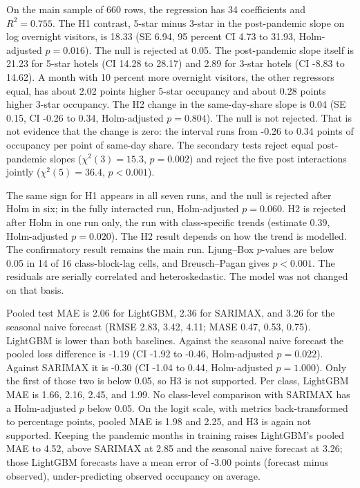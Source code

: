 \documentclass[11pt,a4paper]{article}
\begin{document}
On the main sample of 660 rows, the regression has 34 coefficients and \(R^{2}=0.755\). The H1 contrast, 5-star minus 3-star in the post-pandemic slope on log overnight visitors, is 18.33 (SE 6.94, 95 percent CI 4.73 to 31.93, Holm-adjusted \(p=0.016\)). The null is rejected at 0.05. The post-pandemic slope itself is 21.23 for 5-star hotels (CI 14.28 to 28.17) and 2.89 for 3-star hotels (CI -8.83 to 14.62). A month with 10 percent more overnight visitors, the other regressors equal, has about 2.02 points higher 5-star occupancy and about 0.28 points higher 3-star occupancy. The H2 change in the same-day-share slope is 0.04 (SE 0.15, CI -0.26 to 0.34, Holm-adjusted \(p=0.804\)). The null is not rejected. That is not evidence that the change is zero: the interval runs from -0.26 to 0.34 points of occupancy per point of same-day share. The secondary tests reject equal post-pandemic slopes (\(\chi^{2}(3)=15.3\), \(p=0.002\)) and reject the five post interactions jointly (\(\chi^{2}(5)=36.4\), \(p<0.001\)).

The same sign for H1 appears in all seven runs, and the null is rejected after Holm in six; in the fully interacted run, Holm-adjusted \(p=0.060\). H2 is rejected after Holm in one run only, the run with class-specific trends (estimate 0.39, Holm-adjusted \(p=0.020\)). The H2 result depends on how the trend is modelled. The confirmatory result remains the main run. Ljung--Box \(p\)-values are below 0.05 in 14 of 16 class-block-lag cells, and Breusch--Pagan gives \(p<0.001\). The residuals are serially correlated and heteroskedastic. The model was not changed on that basis.

Pooled test MAE is 2.06 for LightGBM, 2.36 for SARIMAX, and 3.26 for the seasonal naive forecast (RMSE 2.83, 3.42, 4.11; MASE 0.47, 0.53, 0.75). LightGBM is lower than both baselines. Against the seasonal naive forecast the pooled loss difference is -1.19 (CI -1.92 to -0.46, Holm-adjusted \(p=0.022\)). Against SARIMAX it is -0.30 (CI -1.04 to 0.44, Holm-adjusted \(p=1.000\)). Only the first of those two is below 0.05, so H3 is not supported. Per class, LightGBM MAE is 1.66, 2.16, 2.45, and 1.99. No class-level comparison with SARIMAX has a Holm-adjusted \(p\) below 0.05. On the logit scale, with metrics back-transformed to percentage points, pooled MAE is 1.98 and 2.25, and H3 is again not supported. Keeping the pandemic months in training raises LightGBM's pooled MAE to 4.52, above SARIMAX at 2.85 and the seasonal naive forecast at 3.26; those LightGBM forecasts have a mean error of -3.00 points (forecast minus observed), under-predicting observed occupancy on average.
\end{document}
